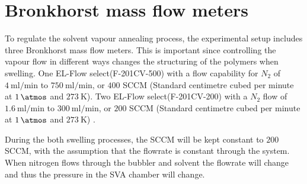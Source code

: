 \documentclass[MasterThesisMain.tex]{subfiles}
\begin{document}
\section{Bronkhorst mass flow meters}
To regulate the solvent vapour annealing process, the experimental setup includes three Bronkhorst mass flow meters. This is important since controlling the vapour flow in different ways changes the structuring of the polymers when swelling. One EL-Flow select(F-201CV-500) with a flow capability for $N_2$ of  $\SI{4}{\milli\litre\per\minute}$ to $\SI{750}{\milli\litre\per\minute}$, or $400$ SCCM (Standard centimetre cubed per minute at $\SI{1}{\atmos}$ and $\SI{273}{\kelvin}$). Two EL-Flow select(F-201CV-200) with a $N_2$ flow of $\SI{1.6}{\milli\litre\per\minute}$ to $\SI{300}{\milli\litre\per\minute}$, or $200$ SCCM (Standard centimetre cubed per minute at $\SI{1}{\atmos}$ and $\SI{273}{\kelvin}$) \cite{elflow}.

During the both swelling processes, the SCCM will be kept constant to $200$ SCCM, with the assumption that the flowrate is constant through the system. When nitrogen flows through the bubbler and solvent the flowrate will change and thus the pressure in the SVA chamber will change. 
\end{document}
